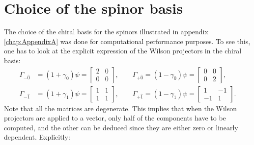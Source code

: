 \section*{Choice of the spinor basis}
The choice of the chiral basis for the spinors illustrated in appendix \ref{chap:AppendixA} was done for computational performance purposes. 
To see this, one has to look at the explicit expression of the Wilson projectors in the chiral basis:
\begin{equation*}
    \begin{aligned}
        \Gamma_{- \hat 0} &= \left(1+\gamma_0\right) \psi=\left[\begin{array}{ll}
            2 & 0 \\
            0 & 0
            \end{array}\right],
        \qquad 
        \Gamma_{+ \hat 0} = \left(1-\gamma_0\right) \psi=\left[\begin{array}{ll}
            0 & 0 \\
            0 & 2
            \end{array}\right],\\
        \Gamma_{- \hat 1} &= \left(1+\gamma_1\right) \psi=\left[\begin{array}{ll}
            1 & 1 \\
            1 & 1
            \end{array}\right],
        \qquad 
        \Gamma_{+ \hat 1} = \left(1-\gamma_1\right) \psi=\left[\begin{array}{cc}
            1 & -1 \\
            -1 & 1
            \end{array}\right].
    \end{aligned}
\end{equation*}
Note that all the matrices are degenerate. This implies that when the Wilson projectors are applied to a vector, only half of the components have to be computed, and the other can be deduced since they are either zero or linearly dependent. Explicitly:
